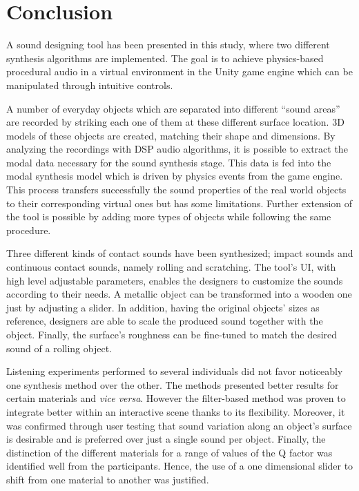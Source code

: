 \chapter{Conclusion}

A sound designing tool has been presented in this study, where two different synthesis algorithms are implemented. The goal is to achieve physics-based procedural audio in a virtual environment in the Unity\textsuperscript{\textregistered} game engine which can be manipulated through intuitive controls. 

A number of everyday objects which are separated into different ``sound areas'' are recorded by striking each one of them at these different surface location. 3D models of these objects are created, matching their shape and dimensions. By analyzing the recordings with \gls{DSP} audio algorithms, it is possible to extract the modal data necessary for the sound synthesis stage. This data is fed into the modal synthesis model which is driven by physics events from the game engine. This process transfers successfully the sound properties of the real world objects to their corresponding virtual ones but has some limitations. Further extension of the tool is possible by adding more types of objects while following the same procedure.

Three different kinds of contact sounds have been synthesized; impact sounds and continuous contact sounds, namely rolling and scratching. The tool's \gls{UI}, with high level adjustable parameters, enables the designers to customize the sounds according to their needs. A metallic object can be transformed into a wooden one just by adjusting a slider. In addition, having the original objects' sizes as reference, designers are able to scale the produced sound together with the object. Finally, the surface's roughness can be fine-tuned to match the desired sound of a rolling object.

Listening experiments performed to several individuals did not favor noticeably one synthesis method over the other. The methods presented better results for certain materials and \textit{vice versa}. However the filter-based method was proven to integrate better within an interactive scene thanks to its flexibility. Moreover, it was confirmed through user testing that sound variation along an object's surface is desirable and is preferred over just a single sound per object. Finally, the distinction of the different materials for a range of values of the \gls{Q} factor was identified well from the participants. Hence, the use of a one dimensional slider to shift from one material to another was justified.

